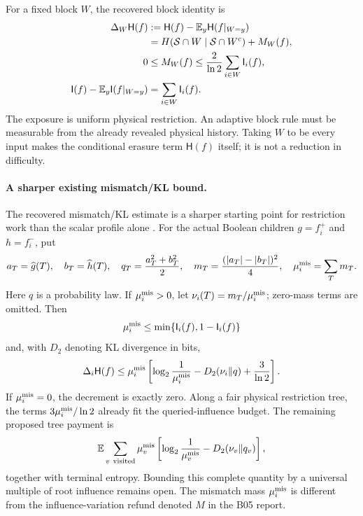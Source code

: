 \documentclass[11pt]{article}
\newcommand{\HH}{\mathsf H}\newcommand{\I}{\mathsf I}
\newcommand{\E}{\mathbb E}\newcommand{\Pp}{\mathbb P}
\begin{document}
For a fixed block $W$, the recovered block identity is
\begin{align}
 \Delta_W\HH(f)
 &:=
 \HH(f)-\E_y\HH(f|_{W=y})\notag\\
 &=H(\mathcal S\cap W\mid\mathcal S\cap W^c)+M_W(f),
 \label{eq:block-erasure}\\
 0&\le M_W(f)\le\frac2{\ln2}\sum_{i\in W}\I_i(f),\notag\\
 \I(f)-\E_y\I(f|_{W=y})&=\sum_{i\in W}\I_i(f).\label{eq:block-influence}
\end{align}
The exposure is uniform physical restriction. An adaptive block rule
must be measurable from the already revealed physical history.
Taking $W$ to be every input makes the conditional erasure term
$\HH(f)$ itself; it is not a reduction in difficulty.

\paragraph{A sharper existing mismatch/KL bound.}
The recovered mismatch/KL estimate is a sharper starting point for
restriction work than the scalar profile alone \cite{BrainMismatch}.
For the actual Boolean children $g=f_i^+$ and $h=f_i^-$, put
\[
 a_T=\widehat{g}(T),\quad b_T=\widehat{h}(T),\quad
 q_T=\frac{a_T^2+b_T^2}{2},\quad
 m_T=\frac{(|a_T|-|b_T|)^2}{4},\quad
 \mu_i^{\rm mis}=\sum_Tm_T.
\]
Here $q$ is a probability law. If $\mu_i^{\rm mis}>0$, let
$\nu_i(T)=m_T/\mu_i^{\rm mis}$; zero-mass terms are omitted.
Then
\[
 \mu_i^{\rm mis}\le
 \min\{\I_i(f),1-\I_i(f)\}
\]
and, with $D_2$ denoting KL divergence in bits,
\[
 \Delta_i\HH(f)\le
 \mu_i^{\rm mis}\left[
 \log_2\frac1{\mu_i^{\rm mis}}
 -D_2(\nu_i\Vert q)+\frac3{\ln2}\right].
\]
If $\mu_i^{\rm mis}=0$, the decrement is exactly zero.
Along a fair physical restriction tree, the terms
$3\mu_i^{\rm mis}/\ln2$ already fit the queried-influence budget.
The remaining proposed tree payment is
\[
 \E\sum_{v\ {\rm visited}}\mu_v^{\rm mis}
 \left[\log_2\frac1{\mu_v^{\rm mis}}
       -D_2(\nu_v\Vert q_v)\right],
\]
together with terminal entropy. Bounding this complete quantity
by a universal multiple of root influence remains open.
The mismatch mass $\mu_i^{\rm mis}$ is different from the
influence-variation refund denoted $M$ in the B05 report.
\end{document}
